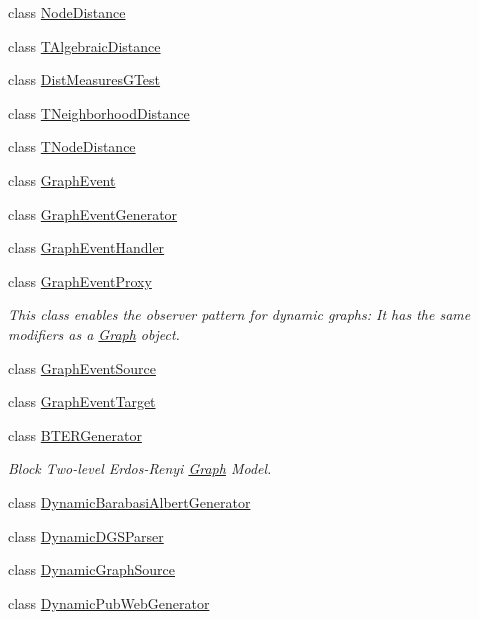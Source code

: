 \begin{DoxyCompactItemize}
class \hyperlink{class_networ_kit_1_1_node_distance}{Node\-Distance}
\item 
class \hyperlink{class_networ_kit_1_1_t_algebraic_distance}{T\-Algebraic\-Distance}
\item 
class \hyperlink{class_networ_kit_1_1_dist_measures_g_test}{Dist\-Measures\-G\-Test}
\item 
class \hyperlink{class_networ_kit_1_1_t_neighborhood_distance}{T\-Neighborhood\-Distance}
\item 
class \hyperlink{class_networ_kit_1_1_t_node_distance}{T\-Node\-Distance}
\item 
class \hyperlink{class_networ_kit_1_1_graph_event}{Graph\-Event}
\item 
class \hyperlink{class_networ_kit_1_1_graph_event_generator}{Graph\-Event\-Generator}
\item 
class \hyperlink{class_networ_kit_1_1_graph_event_handler}{Graph\-Event\-Handler}
\item 
class \hyperlink{class_networ_kit_1_1_graph_event_proxy}{Graph\-Event\-Proxy}
\begin{DoxyCompactList}\small\item\em This class enables the observer pattern for dynamic graphs\-: It has the same modifiers as a \hyperlink{class_networ_kit_1_1_graph}{Graph} object. \end{DoxyCompactList}\item 
class \hyperlink{class_networ_kit_1_1_graph_event_source}{Graph\-Event\-Source}
\item 
class \hyperlink{class_networ_kit_1_1_graph_event_target}{Graph\-Event\-Target}
\item 
class \hyperlink{class_networ_kit_1_1_b_t_e_r_generator}{B\-T\-E\-R\-Generator}
\begin{DoxyCompactList}\small\item\em Block Two-\/level Erdos-\/\-Renyi \hyperlink{class_networ_kit_1_1_graph}{Graph} Model. \end{DoxyCompactList}\item 
class \hyperlink{class_networ_kit_1_1_dynamic_barabasi_albert_generator}{Dynamic\-Barabasi\-Albert\-Generator}
\item 
class \hyperlink{class_networ_kit_1_1_dynamic_d_g_s_parser}{Dynamic\-D\-G\-S\-Parser}
\item 
class \hyperlink{class_networ_kit_1_1_dynamic_graph_source}{Dynamic\-Graph\-Source}
\item 
class \hyperlink{class_networ_kit_1_1_dynamic_pub_web_generator}{Dynamic\-Pub\-Web\-Generator}

\end{DoxyCompactItemize}
